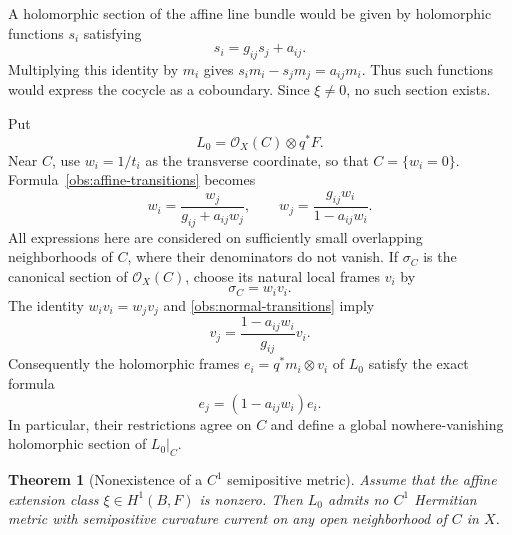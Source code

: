 \documentclass[11pt,a4paper]{article}
\numberwithin{equation}{section}
\newtheorem{theorem}{Theorem}[section]
\theoremstyle{definition}
\theoremstyle{remark}
\newcommand{\OO}{\mathcal O}
\begin{document}
A holomorphic section of the affine line bundle would be given by
holomorphic functions $s_i$ satisfying
\begin{equation}
\label{obs:section-equation}
                    s_i=g_{ij}s_j+a_{ij}.
\end{equation}
Multiplying this identity by $m_i$ gives
$s_i m_i-s_jm_j=a_{ij}m_i$.  Thus such functions would express the
cocycle as a coboundary.  Since $\xi\ne0$, no such section exists.

Put
\[
                  L_0=\OO_X(C)\otimes q^*F.
\]
Near $C$, use $w_i=1/t_i$ as the transverse coordinate, so that
$C=\{w_i=0\}$.  Formula~\eqref{obs:affine-transitions} becomes
\begin{equation}
\label{obs:normal-transitions}
   w_i=\frac{w_j}{g_{ij}+a_{ij}w_j},
   \qquad
   w_j=\frac{g_{ij}w_i}{1-a_{ij}w_i}.
\end{equation}
All expressions here are considered on sufficiently small overlapping
neighborhoods of $C$, where their denominators do not vanish.  If
$\sigma_C$ is the canonical section of $\OO_X(C)$, choose its natural
local frames $v_i$ by
\[
                        \sigma_C=w_i v_i.
\]
The identity $w_i v_i=w_jv_j$ and
\eqref{obs:normal-transitions} imply
\[
                  v_j=\frac{1-a_{ij}w_i}{g_{ij}}v_i.
\]
Consequently the holomorphic frames
$e_i=q^*m_i\otimes v_i$ of $L_0$ satisfy the exact formula
\begin{equation}
\label{obs:line-transitions}
                         e_j=(1-a_{ij}w_i)e_i.
\end{equation}
In particular, their restrictions agree on $C$ and define a global
nowhere-vanishing holomorphic section of $L_0|_C$.

\begin{theorem}[Nonexistence of a $C^1$ semipositive metric]
\label{obs:c1-obstruction}
Assume that the affine extension class $\xi\in H^1(B,F)$ is nonzero.
Then $L_0$ admits no $C^1$ Hermitian metric with semipositive curvature
current on any open neighborhood of $C$ in $X$.
\end{theorem}
\end{document}
